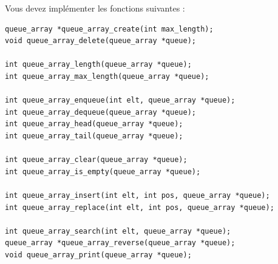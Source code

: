 
\noindent Vous devez implémenter les fonctions suivantes :

\bigskip

\lstset{language=C}
\begin{lstlisting}[frame=single,title={Liste des fonctions pour une file avec liste chaînée}]
queue_array *queue_array_create(int max_length);
void queue_array_delete(queue_array *queue);

int queue_array_length(queue_array *queue);
int queue_array_max_length(queue_array *queue);

int queue_array_enqueue(int elt, queue_array *queue);
int queue_array_dequeue(queue_array *queue);
int queue_array_head(queue_array *queue);
int queue_array_tail(queue_array *queue);

int queue_array_clear(queue_array *queue);
int queue_array_is_empty(queue_array *queue);

int queue_array_insert(int elt, int pos, queue_array *queue);
int queue_array_replace(int elt, int pos, queue_array *queue);

int queue_array_search(int elt, queue_array *queue);
queue_array *queue_array_reverse(queue_array *queue);
void queue_array_print(queue_array *queue);
\end{lstlisting}


